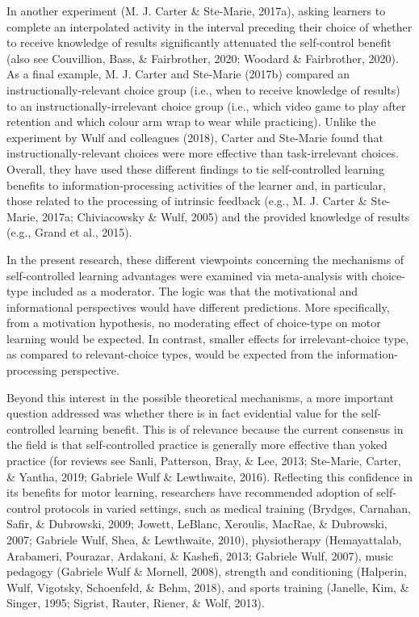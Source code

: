 \documentclass[
  english,
  man,floatsintext]{apa7}
\begin{document}
In another experiment (M. J. Carter \& Ste-Marie, 2017a), asking learners to complete an interpolated activity in the interval preceding their choice of whether to receive knowledge of results significantly attenuated the self-control benefit (also see Couvillion, Bass, \& Fairbrother, 2020; Woodard \& Fairbrother, 2020). As a final example, M. J. Carter and Ste-Marie (2017b) compared an instructionally-relevant choice group (i.e., when to receive knowledge of results) to an instructionally-irrelevant choice group (i.e., which video game to play after retention and which colour arm wrap to wear while practicing). Unlike the experiment by Wulf and colleagues (2018), Carter and Ste-Marie found that instructionally-relevant choices were more effective than task-irrelevant choices. Overall, they have used these different findings to tie self-controlled learning benefits to information-processing activities of the learner and, in particular, those related to the processing of intrinsic feedback (e.g., M. J. Carter \& Ste-Marie, 2017a; Chiviacowsky \& Wulf, 2005) and the provided knowledge of results (e.g., Grand et al., 2015).

In the present research, these different viewpoints concerning the mechanisms of self-controlled learning advantages were examined via meta-analysis with choice-type included as a moderator. The logic was that the motivational and informational perspectives would have different predictions. More specifically, from a motivation hypothesis, no moderating effect of choice-type on motor learning would be expected. In contrast, smaller effects for irrelevant-choice type, as compared to relevant-choice types, would be expected from the information-processing perspective.

Beyond this interest in the possible theoretical mechanisms, a more important question addressed was whether there is in fact evidential value for the self-controlled learning benefit. This is of relevance because the current consensus in the field is that self-controlled practice is generally more effective than yoked practice (for reviews see Sanli, Patterson, Bray, \& Lee, 2013; Ste-Marie, Carter, \& Yantha, 2019; Gabriele Wulf \& Lewthwaite, 2016). Reflecting this confidence in its benefits for motor learning, researchers have recommended adoption of self-control protocols in varied settings, such as medical training (Brydges, Carnahan, Safir, \& Dubrowski, 2009; Jowett, LeBlanc, Xeroulis, MacRae, \& Dubrowski, 2007; Gabriele Wulf, Shea, \& Lewthwaite, 2010), physiotherapy (Hemayattalab, Arabameri, Pourazar, Ardakani, \& Kashefi, 2013; Gabriele Wulf, 2007), music pedagogy (Gabriele Wulf \& Mornell, 2008), strength and conditioning (Halperin, Wulf, Vigotsky, Schoenfeld, \& Behm, 2018), and sports training (Janelle, Kim, \& Singer, 1995; Sigrist, Rauter, Riener, \& Wolf, 2013).
\end{document}
